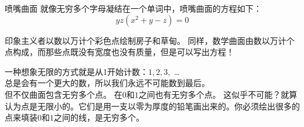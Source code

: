 ﻿\begin{surferPage}{喷嘴曲面}
就像无穷多个字母凝结在一个单词中，喷嘴曲面的方程如下：\\
\smallskip
\[y z (x^2	+ y - z)	= 0\]

\vspace{0.3cm}

印象主义者以数以万计个彩色点绘制房子和草甸。 同样，数学曲面由数以万计个点构成，而那些点既没有宽度也没有质量，但是可以写出方程！\\

\vspace{0.3cm}

一种想象无限的方式就是从1开始计数：$1, 2, 3,$ \dots\\
总是会有一个更大的数，所以我们永远不可能数到最后。\\

\vspace{0.3cm}
但不仅曲面包含无穷多个点。 在$0$和$1$之间也有无穷多个点。 这似乎不可能？就算认为点是无限小的。它们是用一支以零为厚度的铅笔画出来的。你必须绘出很多的点来填装$0$和$1$之间的线，是无穷多个。
\end{surferPage}
